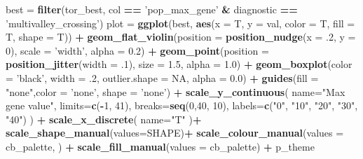 \documentclass[]{book}
\newenvironment{Shaded}{\begin{snugshade}}{\end{snugshade}}
\newcommand{\DataTypeTok}[1]{\textcolor[rgb]{0.13,0.29,0.53}{#1}}
\newcommand{\DecValTok}[1]{\textcolor[rgb]{0.00,0.00,0.81}{#1}}
\newcommand{\FloatTok}[1]{\textcolor[rgb]{0.00,0.00,0.81}{#1}}
\newcommand{\KeywordTok}[1]{\textcolor[rgb]{0.13,0.29,0.53}{\textbf{#1}}}
\newcommand{\NormalTok}[1]{#1}
\newcommand{\OperatorTok}[1]{\textcolor[rgb]{0.81,0.36,0.00}{\textbf{#1}}}
\newcommand{\OtherTok}[1]{\textcolor[rgb]{0.56,0.35,0.01}{#1}}
\newcommand{\StringTok}[1]{\textcolor[rgb]{0.31,0.60,0.02}{#1}}
\begin{document}
\begin{Shaded}
\begin{Highlighting}[]
\NormalTok{best =}\StringTok{ }\KeywordTok{filter}\NormalTok{(tor_best, col }\OperatorTok{==}\StringTok{ 'pop_max_gene'} \OperatorTok{&}\StringTok{ }\NormalTok{diagnostic }\OperatorTok{==}\StringTok{ 'multivalley_crossing'}\NormalTok{)}
\NormalTok{plot =}\StringTok{  }\KeywordTok{ggplot}\NormalTok{(best, }\KeywordTok{aes}\NormalTok{(}\DataTypeTok{x =}\NormalTok{ T, }\DataTypeTok{y =}\NormalTok{ val, }\DataTypeTok{color =}\NormalTok{ T, }\DataTypeTok{fill =}\NormalTok{ T, }\DataTypeTok{shape =}\NormalTok{ T)) }\OperatorTok{+}
\StringTok{          }\KeywordTok{geom_flat_violin}\NormalTok{(}\DataTypeTok{position =} \KeywordTok{position_nudge}\NormalTok{(}\DataTypeTok{x =} \FloatTok{.2}\NormalTok{, }\DataTypeTok{y =} \DecValTok{0}\NormalTok{), }\DataTypeTok{scale =} \StringTok{'width'}\NormalTok{, }\DataTypeTok{alpha =} \FloatTok{0.2}\NormalTok{) }\OperatorTok{+}
\StringTok{          }\KeywordTok{geom_point}\NormalTok{(}\DataTypeTok{position =} \KeywordTok{position_jitter}\NormalTok{(}\DataTypeTok{width =} \FloatTok{.1}\NormalTok{), }\DataTypeTok{size =} \FloatTok{1.5}\NormalTok{, }\DataTypeTok{alpha =} \FloatTok{1.0}\NormalTok{) }\OperatorTok{+}
\StringTok{          }\KeywordTok{geom_boxplot}\NormalTok{(}\DataTypeTok{color =} \StringTok{'black'}\NormalTok{, }\DataTypeTok{width =} \FloatTok{.2}\NormalTok{, }\DataTypeTok{outlier.shape =} \OtherTok{NA}\NormalTok{, }\DataTypeTok{alpha =} \FloatTok{0.0}\NormalTok{) }\OperatorTok{+}
\StringTok{          }\KeywordTok{guides}\NormalTok{(}\DataTypeTok{fill =} \StringTok{"none"}\NormalTok{,}\DataTypeTok{color =} \StringTok{'none'}\NormalTok{, }\DataTypeTok{shape =} \StringTok{'none'}\NormalTok{) }\OperatorTok{+}
\StringTok{          }\KeywordTok{scale_y_continuous}\NormalTok{(}
            \DataTypeTok{name=}\StringTok{"Max gene value"}\NormalTok{,}
            \DataTypeTok{limits=}\KeywordTok{c}\NormalTok{(}\OperatorTok{-}\DecValTok{1}\NormalTok{, }\DecValTok{41}\NormalTok{),}
            \DataTypeTok{breaks=}\KeywordTok{seq}\NormalTok{(}\DecValTok{0}\NormalTok{,}\DecValTok{40}\NormalTok{, }\DecValTok{10}\NormalTok{),}
            \DataTypeTok{labels=}\KeywordTok{c}\NormalTok{(}\StringTok{"0"}\NormalTok{, }\StringTok{"10"}\NormalTok{, }\StringTok{"20"}\NormalTok{, }\StringTok{"30"}\NormalTok{, }\StringTok{"40"}\NormalTok{)}
\NormalTok{          ) }\OperatorTok{+}
\StringTok{          }\KeywordTok{scale_x_discrete}\NormalTok{(}
            \DataTypeTok{name=}\StringTok{"T"}
\NormalTok{          )}\OperatorTok{+}
\StringTok{          }\KeywordTok{scale_shape_manual}\NormalTok{(}\DataTypeTok{values=}\NormalTok{SHAPE)}\OperatorTok{+}
\StringTok{          }\KeywordTok{scale_colour_manual}\NormalTok{(}\DataTypeTok{values =}\NormalTok{ cb_palette, ) }\OperatorTok{+}
\StringTok{          }\KeywordTok{scale_fill_manual}\NormalTok{(}\DataTypeTok{values =}\NormalTok{ cb_palette) }\OperatorTok{+}
\StringTok{          }\NormalTok{p_theme}


\end{Highlighting}
\end{Shaded}
\end{document}
